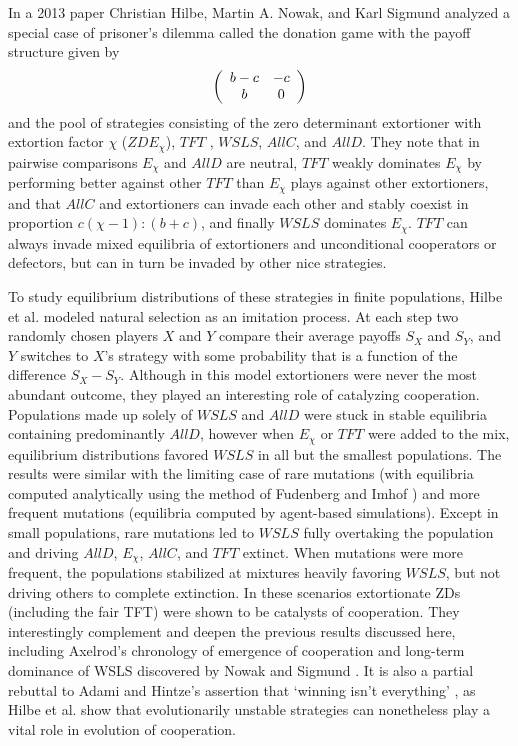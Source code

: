 In a 2013 paper Christian Hilbe, Martin A. Nowak, and Karl Sigmund analyzed a special case of prisoner's dilemma called the donation game with the payoff structure given by
\[
\left(
\begin{array}{c c}
b-c & -c\\
b & 0
\end{array}
\right)
\]
and the pool of strategies consisting of the zero determinant extortioner with extortion factor $\chi$ ($ZDE_\chi$), $TFT$ , $WSLS$, $AllC$, and $AllD$. They note that in pairwise comparisons $E_\chi$ and $AllD$ are neutral, $TFT$ weakly dominates $E_\chi$ by performing better against other $TFT$ than $E_\chi$ plays against other extortioners, and that $AllC$ and extortioners can invade each other and stably coexist in proportion $c(\chi-1):(b+c)$, and finally $WSLS$ dominates $E_\chi$. $TFT$ can always invade mixed equilibria of extortioners and unconditional cooperators or defectors, but can in turn be invaded by other nice strategies.

To study equilibrium distributions of these strategies in finite populations, Hilbe et al. modeled natural selection as an imitation process. At each step two randomly chosen players $X$ and $Y$ compare their average payoffs $S_X$ and $S_Y$, and $Y$ switches to $X$'s strategy with some probability that is a function of the difference $S_X - S_Y$. Although in this model extortioners were never the most abundant outcome, they played an interesting role of catalyzing cooperation. Populations made up solely of $WSLS$ and $AllD$ were stuck in stable equilibria containing predominantly $AllD$, however when $E_\chi$ or $TFT$ were added to the mix, equilibrium distributions favored $WSLS$ in all but the smallest populations. The results were similar with the limiting case of rare mutations (with equilibria computed analytically using the method of Fudenberg and Imhof \cite{Fudenberg_2006}) and more frequent mutations (equilibria computed by agent-based simulations). Except in small populations, rare mutations led to $WSLS$ fully overtaking the population and driving $AllD$, $E_\chi$, $AllC$, and $TFT$ extinct. When mutations were more frequent, the populations stabilized at mixtures heavily favoring $WSLS$, but not driving others to complete extinction. In these scenarios extortionate ZDs (including the fair TFT) were shown to be catalysts of cooperation. They interestingly complement and deepen the previous results discussed here, including Axelrod's chronology of emergence of cooperation \cite[p.55]{axelrod1984evolution} and long-term dominance of WSLS discovered by Nowak and Sigmund \cite{Nowak1993}. It is also a partial rebuttal to Adami and Hintze's assertion that `winning isn't everything' \cite{Adami_Hintze_2014}, as Hilbe et al. show that evolutionarily unstable strategies can nonetheless play a vital role in evolution of cooperation.

